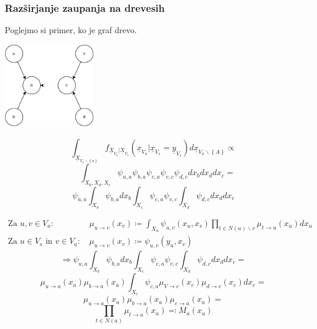 \documentclass{beamer}
\renewcommand{\vec}{\underline}
\theoremstyle{definition}
\begin{document}
  \begin{frame}
    \frametitle{Razširjanje zaupanja na drevesih}
    Poglejmo si primer, ko je graf drevo.
    \setlength{\columnsep}{-5cm}
    \begin{multicols}{2}
      \includegraphics[width=4cm]{message_passing.pdf}
      \columnbreak{}

      \vspace{5cm}
      $$
      \int_{\vec{X}_{V_a \backslash \left\{a\right\}}} f_{\vec{X}_{V_a} | \vec{X}_{V_s}}\left(\vec{x}_{V_a} | \vec{x}_{V_s} = \vec{y}_{V_s}\right)
      d\vec{x}_{V_a \backslash \left\{A\right\}}\propto
      $$
      $$
      \quad \int_{X_b,X_d,X_c} \psi_{u,a} \psi_{b,a} \psi_{c,a} \psi_{v,c} \psi_{d,c}dx_bdx_ddx_c =
      $$
      \pause
      \vspace{1cm}
      $$
      \psi_{u,a} \int_{X_b} \psi_{b,a}dx_b \int_{X_c} \psi_{c,a} \psi_{v,c}
      \int_{X_d} \psi_{d,c}dx_ddx_c
      $$
    \end{multicols}
  \end{frame}


  \begin{frame}
    \begin{align*}
      \text{Za } u,v \in V_a\text{: } &
      \mu_{u \to v}\left(x_v\right) \coloneqq
      \int_{X_u} \psi_{u,v}\left(x_u,x_v\right)
      \prod_{t\in N\left(u\right)\backslash v}
      \mu_{t \to u}\left(x_u\right)dx_u
      \\
      \text{Za }u \in V_s\text{ in }v \in V_a\text{: } &
      \mu_{u \to v}\left(x_v\right) \coloneqq
      \psi_{u,v}\left(y_u,x_v\right)
    \end{align*}
    \pause
    $$
    \Rightarrow
    \psi_{u,a} \int_{X_b} \psi_{b,a}dx_b \int_{X_c} \psi_{c,a} \psi_{v,c}
    \int_{X_d} \psi_{d,c}dx_ddx_c=
    $$
    \pause
    $$
    \mu_{u \to a}\left(x_a\right)\mu_{b \to a}\left(x_a\right)
    \int_{X_c} \psi_{c,a}
    \mu_{V \to c}\left(x_c\right)
    \mu_{d \to c}\left(x_c\right)dx_c=
    $$
    \pause
    $$
    \mu_{u \to a}\left(x_a\right)\mu_{b \to a}\left(x_a\right)
    \mu_{c \to a}\left(x_a\right) =
    $$
    $$
    \prod_{t \in N\left(a\right)}\mu_{t \to a}\left(x_a\right) \eqqcolon M_a\left(x_a\right)
    $$
  \end{frame}
\end{document}
